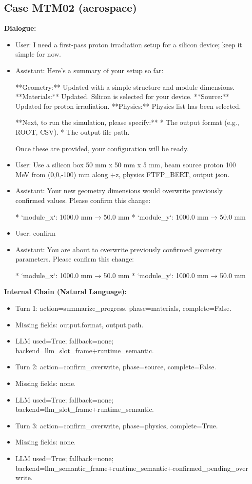 \documentclass[11pt]{ctexart}
\begin{document}
\subsection{Case MTM02 (aerospace)}
\textbf{Dialogue:}
\begin{itemize}
\item User: I need a first-pass proton irradiation setup for a silicon device; keep it simple for now.
\item Assistant: Here's a summary of your setup so far:

**Geometry:** Updated with a simple structure and module dimensions.
**Materials:** Updated. Silicon is selected for your device.
**Source:** Updated for proton irradiation.
**Physics:** Physics list has been selected.

**Next, to run the simulation, please specify:**
*   The output format (e.g., ROOT, CSV).
*   The output file path.

Once these are provided, your configuration will be ready.
\item User: Use a silicon box 50 mm x 50 mm x 5 mm, beam source proton 100 MeV from (0,0,-100) mm along +z, physics FTFP\_BERT, output json.
\item Assistant: Your new geometry dimensions would overwrite previously confirmed values. Please confirm this change:

*   `module\_x`: 1000.0 mm → 50.0 mm
*   `module\_y`: 1000.0 mm → 50.0 mm
\item User: confirm
\item Assistant: You are about to overwrite previously confirmed geometry parameters. Please confirm this change:

*   `module\_x`: 1000.0 mm → 50.0 mm
*   `module\_y`: 1000.0 mm → 50.0 mm
\end{itemize}
\textbf{Internal Chain (Natural Language):}
\begin{itemize}
\item Turn 1: action=summarize\_progress, phase=materials, complete=False.
\item Missing fields: output.format, output.path.
\item LLM used=True; fallback=none; backend=llm\_slot\_frame+runtime\_semantic.
\item Turn 2: action=confirm\_overwrite, phase=source, complete=False.
\item Missing fields: none.
\item LLM used=True; fallback=none; backend=llm\_slot\_frame+runtime\_semantic.
\item Turn 3: action=confirm\_overwrite, phase=physics, complete=True.
\item Missing fields: none.
\item LLM used=True; fallback=none; backend=llm\_semantic\_frame+runtime\_semantic+confirmed\_pending\_overwrite.
\end{itemize}
\end{document}
